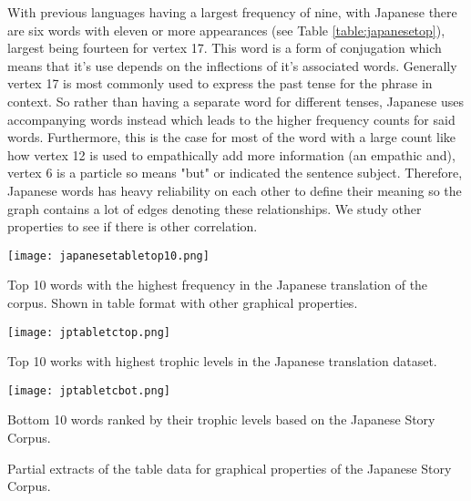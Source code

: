 With previous languages having a largest frequency of nine, with Japanese there are six words with eleven or more appearances (see Table \ref{table:japanesetop}), largest being fourteen for vertex 17. This word is a form of conjugation which means that it's use depends on the inflections of it's associated words. Generally vertex 17 is most commonly used to express the past tense for the phrase in context. So rather than having a separate word for different tenses, Japanese uses accompanying words instead which leads to the higher frequency counts for said words. Furthermore, this is the case for most of the word with a large count like how vertex 12 is used to empathically add more information (an empathic and), vertex 6 is a particle so means "but" or indicated the sentence subject. Therefore, Japanese words has heavy reliability on each other to define their meaning so the graph contains a lot of edges denoting these relationships. We study other properties to see if there is other correlation.

\begin{table}[H]
\centering
\texttt{[image: japanesetabletop10.png]}
\caption{Top 10 words with the highest frequency in the Japanese translation of the corpus. Shown in table format with other graphical properties. }
\label{table:japanesetop}
\end{table}

\begin{table}[H]
\centering
\begin{subtable}{.45\textwidth}
	\centering
	\texttt{[image: jptabletctop.png]}
	\caption{Top 10 works with highest trophic levels in the Japanese translation dataset.}
	\label{table:japanesentoptc}
\end{subtable}
\hfill
\begin{subtable}{.45\textwidth}
	\centering
	\texttt{[image: jptabletcbot.png]}
	\caption{Bottom 10 words ranked by their trophic levels based on the Japanese Story Corpus.}
	\label{table:japanesebottc}
\end{subtable}
\caption{Partial extracts of the table data for graphical properties of the Japanese Story Corpus.}
\end{table}

